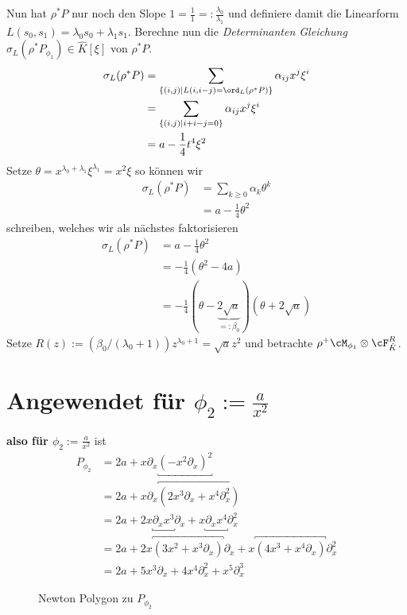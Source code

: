 \begin{comment}
Ab hier nochmal neu / verbessern!\\
wechselt variable t |-> x
\end{comment}
Nun hat $\rho^*P$ nur noch den Slope
$1=\frac{1}{1}=:\frac{\lambda_0}{\lambda_1}$ und definiere damit die Linearform
$L(s_0,s_1)=\lambda_0s_0+\lambda_1s_1$.  Berechne nun die \emph{Determinanten
Gleichung} $\sigma_L(\rho^*P_{\phi_1})\in \hat
K[\xi]$ von $\rho^*P$. 
\begin{align*}
\sigma_L(\rho^*P) 
&= \sum_{\{(i,j) \mid L(i,i-j)=\ord_L(\rho^*P)\}}\alpha_{ij}x^j\xi^i\\
&= \sum_{\{(i,j) \mid i + i-j=0\}}\alpha_{ij}x^j\xi^i\\
&= a-\frac{1}{4}t^4\xi^2
\end{align*}
Setze $\theta=x^{\lambda_0+\lambda_1}\xi^{\lambda_1}=x^2\xi$ so können wir 
\begin{align*}
\sigma_L(\rho^*P) &= \sum_{k\geq 0}\alpha_k\theta^k\\
&= a-\frac{1}{4}\theta^2
\end{align*}
schreiben, welches wir als nächstes faktorisieren
\begin{align*}
\sigma_L(\rho^*P) &= a-\frac{1}{4}\theta^2\\
&=-\frac{1}{4}(\theta^2-4a)\\
&=-\frac{1}{4}
  (\theta-\underset{=:\beta_0}{\underbrace{2\sqrt{a}}})(\theta+2\sqrt{a})
\end{align*}
Setze $R(z):=(\beta_0/(\lambda_0+1))z^{\lambda_0+1}=\sqrt{a}z^2$ und betrachte
$\rho^+\cM_{\phi_1}\otimes\cF_{\hat K}^R$.

\section{Angewendet für $\phi_2:=\frac{a}{x^2}$}
\textbf{also für $\phi_2:=\frac{a}{x^2}$} ist
\begin{align*}
P_{\phi_2} &=2a+x\partial_x\underbracket{(-x^2\partial_x)^{2}}\\
           &=2a +x\partial_x \overbracket{(2x^3\partial_x+x^4\partial_x^2)} \\
           &=2a 
             +2x\underbracket{\partial_xx^3}\partial_x
             +x\underbracket{\partial_xx^4}\partial_x^2 \\
           &=2a 
             +2x\overbracket{(3x^2+x^3\partial_x)}\partial_x
             +x\overbracket{(4x^3+x^4\partial_x)}\partial_x^2 \\
           &=2a+5x^3\partial_x+4x^{4}\partial_x^2+x^5\partial_x^3
\end{align*}
\begin{figure}[H]
\caption{Newton Polygon zu $P_{\phi_2}$}
\begin{center}
\end{center}
\end{figure}

